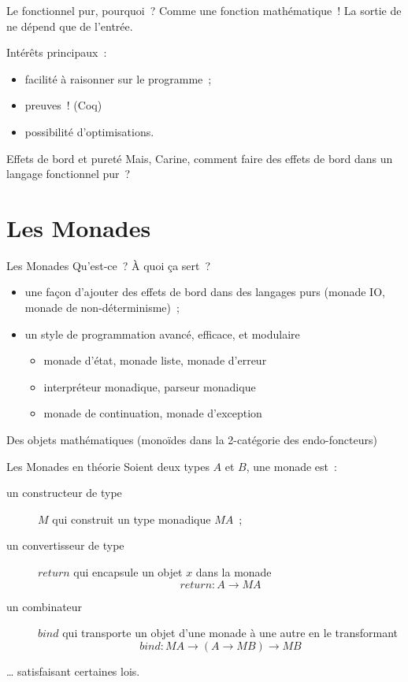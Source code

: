 \documentclass[10pt]{beamer}
\begin{document}
\begin{frame}{Le fonctionnel pur, pourquoi~?}
  Comme une fonction mathématique~! La sortie de ne dépend que de
  l'entrée.

  Intérêts principaux~:
  \begin{itemize}
  \item facilité à raisonner sur le programme~;
  \item preuves~! (Coq)
  \item possibilité d'optimisations.
  \end{itemize}
\end{frame}

\begin{frame}{Effets de bord et pureté}
  Mais, Carine, comment faire des effets de bord dans un langage
  fonctionnel pur~?
\end{frame}

\section{Les Monades}

\begin{frame}{Les Monades}
  Qu'est-ce~? À quoi ça sert~?
  \begin{itemize}
  \item une façon d’ajouter des effets de bord dans des langages purs
    (monade IO, monade de non-déterminisme)~;
  \item un style de programmation avancé, efficace, et modulaire
    \begin{itemize}
    \item monade d'état, monade liste, monade d'erreur
    \item interpréteur monadique, parseur monadique
    \item monade de continuation, monade d'exception
    \end{itemize}
  \end{itemize}

  Des objets mathématiques (monoïdes dans la 2-catégorie des
  endo-foncteurs)
\end{frame}

\begin{frame}{Les Monades en théorie}
  Soient deux types $A$ et $B$, une monade est~:
  \begin{description}
  \item[un constructeur de type] $M$ qui construit un type monadique
    $M A$~;
  \item[un convertisseur de type]
    $return$ qui encapsule un objet $x$ dans la monade
    \[ return : A \to M A \]
  \item[un combinateur] $bind$ qui transporte un objet d'une monade à
    une autre en le transformant
    \[ bind : M A \to (A \to M B) \to M B \]
  \end{description}
  … satisfaisant certaines lois.
\end{frame}
\end{document}
